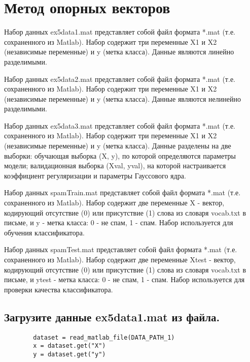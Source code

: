 







\section{Метод опорных векторов}
\label{sec:purpose}

Набор данных ex5data1.mat представляет собой файл формата *.mat (т.е. сохраненного из Matlab). Набор содержит три переменные X1 и X2 (независимые переменные) и y (метка класса). Данные являются линейно разделимыми.

Набор данных ex5data2.mat представляет собой файл формата *.mat (т.е. сохраненного из Matlab). Набор содержит три переменные X1 и X2 (независимые переменные) и y (метка класса). Данные являются нелинейно разделимыми.

Набор данных ex5data3.mat представляет собой файл формата *.mat (т.е. сохраненного из Matlab). Набор содержит три переменные X1 и X2 (независимые переменные) и y (метка класса). Данные разделены на две выборки: обучающая выборка (X, y), по которой определяются параметры модели; валидационная выборка (Xval, yval), на которой настраивается коэффициент регуляризации и параметры Гауссового ядра.

Набор данных spamTrain.mat представляет собой файл формата *.mat (т.е. сохраненного из Matlab). Набор содержит две переменные X - вектор, кодирующий отсутствие (0) или присутствие (1) слова из словаря vocab.txt в письме, и y - метка класса: 0 - не спам, 1 - спам. Набор используется для обучения классификатора.

Набор данных spamTest.mat представляет собой файл формата *.mat (т.е. сохраненного из Matlab). Набор содержит две переменные Xtest - вектор, кодирующий отсутствие (0) или присутствие (1) слова из словаря vocab.txt в письме, и ytest - метка класса: 0 - не спам, 1 - спам. Набор используется для проверки качества классификатора.


\subsection{Загрузите данные ex5data1.mat из файла.}

\begin{lstlisting}
        dataset = read_matlab_file(DATA_PATH_1)
        x = dataset.get("X")
        y = dataset.get("y")
\end{lstlisting}

